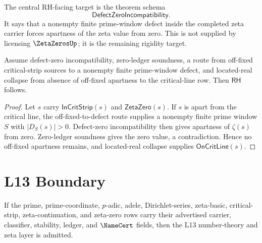 \begin{principle}
\label{prin:number-theory-spine-defect-zero-incompatibility}
The central RH-facing target is the theorem schema
$$
\mathsf{DefectZeroIncompatibility}.
$$
It says that a nonempty finite prime-window defect inside the completed zeta
carrier forces apartness of the zeta value from zero.  This is not supplied by
licensing $\ZetaZerosUp$; it is the remaining rigidity target.
\end{principle}

\begin{theorem}
\label{thm:number-theory-spine-defect-implies-rh}
Assume defect-zero incompatibility, zero-ledger soundness, a route from
off-fixed critical-strip sources to a nonempty finite prime-window defect, and
located-real collapse from absence of off-fixed apartness to the critical-line
row.  Then $\mathsf{RH}$ follows.
\end{theorem}

\begin{proof}
Let $s$ carry $\mathsf{InCritStrip}(s)$ and $\mathsf{ZetaZero}(s)$.  If $s$
is apart from the critical line, the off-fixed-to-defect route supplies a
nonempty finite prime window $S$ with $|D_S(s)|>0$.  Defect-zero
incompatibility then gives apartness of $\zeta(s)$ from zero.  Zero-ledger
soundness gives the zero value, a contradiction.  Hence no off-fixed apartness
remains, and located-real collapse supplies $\mathsf{OnCritLine}(s)$.
\end{proof}

\section{L13 Boundary}
\label{sec:number-theory-spine-boundary}

\begin{theorem}
\label{thm:number-theory-spine-admission}
If the prime, prime-coordinate, $p$-adic, adele, Dirichlet-series,
zeta-basic, critical-strip, zeta-continuation, and zeta-zero rows carry their
advertised carrier, classifier, stability, ledger, and $\NameCert$ fields,
then the L13 number-theory and zeta layer is admitted.
\end{theorem}

